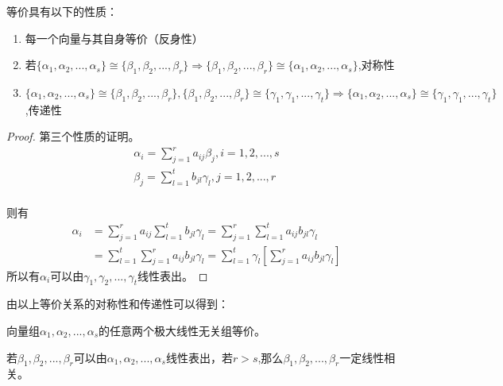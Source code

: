 \documentclass[blue,normal,cn]{elegantnote}
\begin{document}
\begin{property}
    等价具有以下的性质：
    \begin{enumerate}
            \item 每一个向量与其自身等价（反身性）
            \item 若$ \{α_1,α_2,...,α_s\} \cong \{β_1,β_2,...,β_r\} \Rightarrow \{β_1,β_2,...,β_r\} \cong \{α_1,α_2,...,α_s\}$,对称性
            \item  $\{α_1,α_2,...,α_s\} \cong \{β_1,β_2,...,β_r\},\{β_1,β_2,...,β_r\} \cong \{γ_1,γ_1,...,γ_t\} \Rightarrow  \{α_1,α_2,...,α_s\} \cong \{γ_1,γ_1,...,γ_t\}$,传递性
    \end{enumerate}
\end{property}
\begin{proof}
第三个性质的证明。
    \begin{equation*}
        \begin{aligned}
            α_i=\sum_{j=1}^{r}a_{ij}β_{j},i=1,2,...,s\\
            β_j=\sum_{l=1}^{t}b_{jl}γ_{l},j=1,2,...,r\\
        \end{aligned}
    \end{equation*}

    则有
    \begin{equation*}
        \begin{aligned}
            α_i&=\sum_{j=1}^{r}a_{ij}\sum_{l=1}^{t}b_{jl}γ_{l}=\sum_{j=1}^{r}\sum_{l=1}^{t}a_{ij}b_{jl}γ_{l}\\
            &=\sum_{l=1}^{t}\sum_{j=1}^{r}a_{ij}b_{jl}γ_{l}=\sum_{l=1}^{t}γ_{l}\left[\sum_{j=1}^{r}a_{ij}b_{jl}γ_{l}\right]
        \end{aligned}
    \end{equation*}
    所以有$α_i$可以由$γ_1,γ_2,...,γ_t$线性表出。
\end{proof}
由以上等价关系的对称性和传递性可以得到：
\begin{proposition}
向量组$α_1,α_2,...,α_s$的任意两个极大线性无关组等价。
\end{proposition}

\begin{lemma}
若$β_1,β_2,...,β_r$可以由$α_1,α_2,...,α_s$线性表出，若$r>s$,那么$β_1,β_2,...,β_r$一定线性相关。
\end{lemma}
\end{document}
